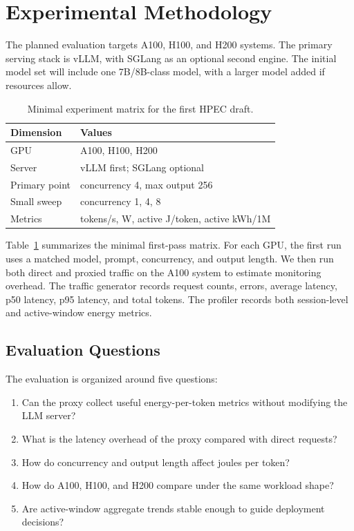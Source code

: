 \documentclass[conference]{IEEEtran}
\begin{document}
\section{Experimental Methodology}

The planned evaluation targets A100, H100, and H200 systems. The primary serving stack is vLLM, with SGLang as an optional second engine. The initial model set will include one 7B/8B-class model, with a larger model added if resources allow.

\begin{table}[t]
\centering
\caption{Minimal experiment matrix for the first HPEC draft.}
\label{tab:matrix}
\begin{tabular}{ll}
\toprule
Dimension & Values \\
\midrule
GPU & A100, H100, H200 \\
Server & vLLM first; SGLang optional \\
Primary point & concurrency 4, max output 256 \\
Small sweep & concurrency 1, 4, 8 \\
Metrics & tokens/s, W, active J/token, active kWh/1M \\
\bottomrule
\end{tabular}
\end{table}

Table~\ref{tab:matrix} summarizes the minimal first-pass matrix. For each GPU, the first run uses a matched model, prompt, concurrency, and output length. We then run both direct and proxied traffic on the A100 system to estimate monitoring overhead. The traffic generator records request counts, errors, average latency, p50 latency, p95 latency, and total tokens. The profiler records both session-level and active-window energy metrics.

\subsection{Evaluation Questions}

The evaluation is organized around five questions:

\begin{enumerate}
    \item Can the proxy collect useful energy-per-token metrics without modifying the LLM server?
    \item What is the latency overhead of the proxy compared with direct requests?
    \item How do concurrency and output length affect joules per token?
    \item How do A100, H100, and H200 compare under the same workload shape?
    \item Are active-window aggregate trends stable enough to guide deployment decisions?
\end{enumerate}
\end{document}
